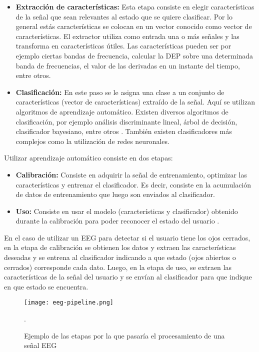 \begin{itemize}
  \item \textbf{Extracción de características:} Esta etapa consiste en elegir características de la señal que sean relevantes al estado que se quiere clasificar. Por lo general estás características se colocan en un vector conocido como vector de características. El extractor utiliza como entrada una o más señales y las transforma en características útiles. Las características pueden ser por ejemplo ciertas bandas de frecuencia, calcular la DEP sobre una determinada banda de frecuencias, el valor de las derivadas en un instante del tiempo, entre otros. 
  \item \textbf{Clasificación:} En este paso se le asigna una clase a un conjunto de características (vector de características) extraído de la señal. Aquí se utilizan algoritmos de aprendizaje automático. Existen diversos algoritmos de clasificación, por ejemplo análisis discriminante lineal, árbol de decisión, clasificador bayesiano, entre otros \cite{eeg-tutorial}. También existen clasificadores más complejos como la utilización de redes neuronales.
\end{itemize}

Utilizar aprendizaje automático consiste en dos etapas:

\begin{itemize}
	\item \textbf{Calibración:} Consiste en adquirir la señal de entrenamiento, optimizar las características y entrenar el clasificador. Es decir, consiste en la acumulación de datos de entrenamiento que luego son enviados al clasificador.
	\item \textbf{Uso:} Consiste en usar el modelo (características y clasificador) obtenido durante la calibración para poder reconocer el estado del usuario \cite{eeg-tutorial}. 
\end{itemize}

En el caso de utilizar un EEG para detectar si el usuario tiene los ojos cerrados, en la etapa de calibración se obtienen los datos y extraen las características deseadas y se entrena al clasificador indicando a que estado (ojos abiertos o cerrados) corresponde cada dato. Luego, en la etapa de uso, se extraen las características de la señal del usuario y se envían al clasificador para que indique en que estado se encuentra.

\begin{figure}[H]
	\centering
    \texttt{[image: eeg-pipeline.png]}
    \caption{Ejemplo de las etapas por la que pasaría el procesamiento de una señal EEG \cite{eeg-tutorial}}.
	\label{fig:eeg-pipeline}
\end{figure}

